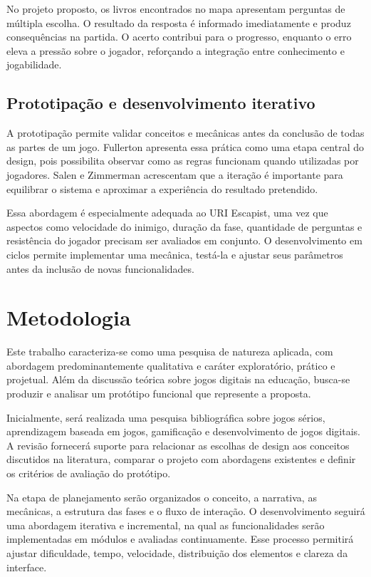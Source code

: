 \documentclass[12pt]{article}
\begin{document}
No projeto proposto, os livros encontrados no mapa apresentam perguntas de múltipla escolha. O resultado da resposta é informado imediatamente e produz consequências na partida. O acerto contribui para o progresso, enquanto o erro eleva a pressão sobre o jogador, reforçando a integração entre conhecimento e jogabilidade.

\subsection{Prototipação e desenvolvimento iterativo}

A prototipação permite validar conceitos e mecânicas antes da conclusão de todas as partes de um jogo. Fullerton \cite{fullerton2018} apresenta essa prática como uma etapa central do design, pois possibilita observar como as regras funcionam quando utilizadas por jogadores. Salen e Zimmerman \cite{salen2004} acrescentam que a iteração é importante para equilibrar o sistema e aproximar a experiência do resultado pretendido.

Essa abordagem é especialmente adequada ao URI Escapist, uma vez que aspectos como velocidade do inimigo, duração da fase, quantidade de perguntas e resistência do jogador precisam ser avaliados em conjunto. O desenvolvimento em ciclos permite implementar uma mecânica, testá-la e ajustar seus parâmetros antes da inclusão de novas funcionalidades.

\section{Metodologia}

Este trabalho caracteriza-se como uma pesquisa de natureza aplicada, com abordagem predominantemente qualitativa e caráter exploratório, prático e projetual. Além da discussão teórica sobre jogos digitais na educação, busca-se produzir e analisar um protótipo funcional que represente a proposta.

Inicialmente, será realizada uma pesquisa bibliográfica sobre jogos sérios, aprendizagem baseada em jogos, gamificação e desenvolvimento de jogos digitais. A revisão fornecerá suporte para relacionar as escolhas de design aos conceitos discutidos na literatura, comparar o projeto com abordagens existentes e definir os critérios de avaliação do protótipo.

Na etapa de planejamento serão organizados o conceito, a narrativa, as mecânicas, a estrutura das fases e o fluxo de interação. O desenvolvimento seguirá uma abordagem iterativa e incremental, na qual as funcionalidades serão implementadas em módulos e avaliadas continuamente. Esse processo permitirá ajustar dificuldade, tempo, velocidade, distribuição dos elementos e clareza da interface.
\end{document}
